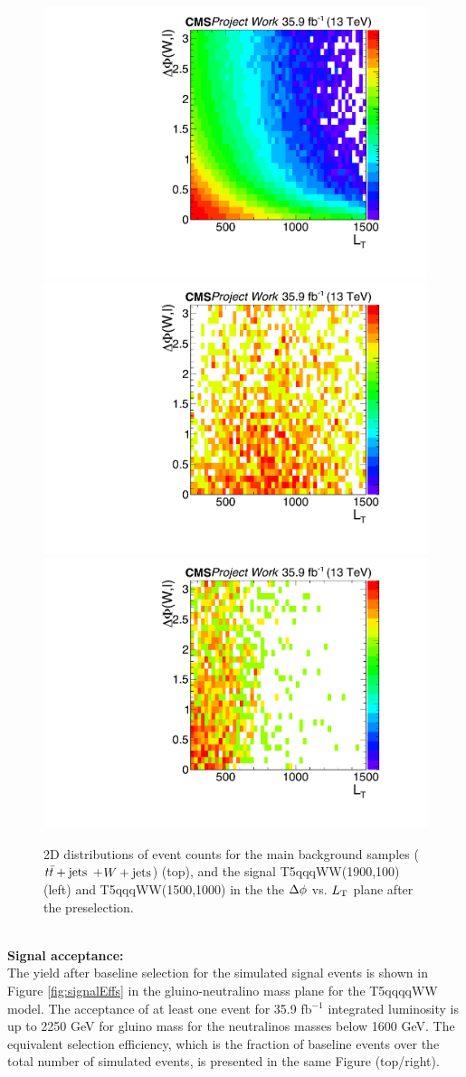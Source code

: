  \begin{figure}[!hbt]
    \begin{center}
 \includegraphics[width=0.45 \textwidth]{Plots/analysis/signalRegions/2D_TTWJets}\\
 \includegraphics[width=0.45 \textwidth]{Plots/analysis/signalRegions/2D_s1900_100}
 \includegraphics[width=0.45 \textwidth]{Plots/analysis/signalRegions/2D_s1500_1000}
  \caption{ \label{fig:2Ds} 2D distributions of event counts for the main background samples ($t\bar{t}+\textrm{jets}$ +$W+\textrm{jets}$) (top), and the signal T5qqqWW(1900,100) (left) and T5qqqWW(1500,1000) in the the $\Delta \phi$ vs. $L_{\rm T}$ plane after the preselection.
  }
   \end{center}
\end{figure}
\\
\textbf{Signal acceptance:}\\
The yield after baseline selection for the simulated signal events is shown in Figure \ref{fig:signalEffs} in the gluino-neutralino mass plane for the T5qqqqWW model. The acceptance of at least one event for 35.9 fb$^{-1}$ integrated luminosity is up to 2250 GeV for gluino mass for the neutralinos masses below 1600 GeV. The equivalent selection efficiency, which is the fraction of baseline events over the total number of simulated events, is presented in the same Figure (top/right).
